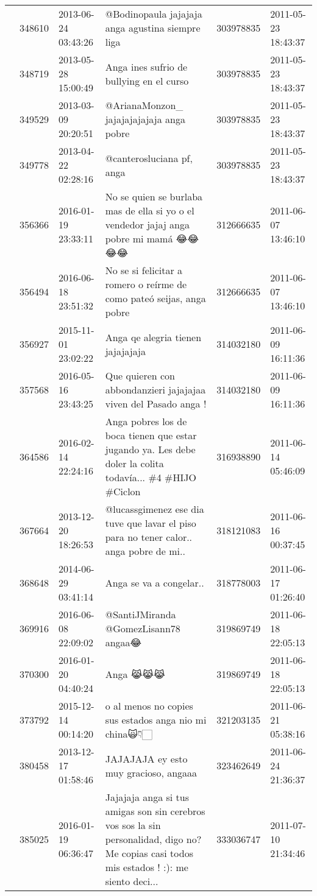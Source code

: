\begin{tabular}{llllrl}
 & 348610& 2013-06-24 03:43:26 & @Bodinopaula jajajaja anga agustina siempre liga & 303978835 & 2011-05-23 18:43:37 \\
 & 348719& 2013-05-28 15:00:49 & Anga ines sufrio de bullying en el curso & 303978835 & 2011-05-23 18:43:37 \\
 & 349529& 2013-03-09 20:20:51 & @ArianaMonzon\_ jajajajajajaja anga pobre & 303978835 & 2011-05-23 18:43:37 \\
 & 349778& 2013-04-22 02:28:16 &@canterosluciana pf, anga & 303978835 & 2011-05-23 18:43:37 \\
 & 356366& 2016-01-19 23:33:11 & No se quien se burlaba mas de ella si yo o el vendedor jajaj anga pobre mi mamá 😂😂😂😂 & 312666635 & 2011-06-07 13:46:10 \\
 & 356494& 2016-06-18 23:51:32 &No se si felicitar a romero o reírme de como pateó seijas, anga pobre & 312666635 & 2011-06-07 13:46:10 \\
 & 356927& 2015-11-01 23:02:22 &Anga qe alegria tienen jajajajaja & 314032180 & 2011-06-09 16:11:36 \\
 & 357568& 2016-05-16 23:43:25 &Que quieren con abbondanzieri jajajajaa viven del Pasado anga ! & 314032180 & 2011-06-09 16:11:36 \\
 & 364586& 2016-02-14 22:24:16 &Anga pobres los de boca tienen que estar jugando ya. Les debe doler la colita todavía... \#4 \#HIJO \#Ciclon & 316938890 & 2011-06-14 05:46:09 \\
 & 367664& 2013-12-20 18:26:53 & @lucassgimenez ese dia tuve que lavar el piso para no tener calor.. anga pobre de mi.. & 318121083 & 2011-06-16 00:37:45 \\
 & 368648& 2014-06-29 03:41:14 &Anga se va a congelar.. & 318778003 & 2011-06-17 01:26:40 \\
 & 369916& 2016-06-08 22:09:02 & @SantiJMiranda @GomezLisann78 angaa😂 & 319869749 & 2011-06-18 22:05:13 \\
 & 370300& 2016-01-20 04:40:24 & Anga 😹😹😹 & 319869749 & 2011-06-18 22:05:13 \\
 & 373792& 2015-12-14 00:14:20 &o al menos no copies sus estados anga nio mi china🙀👇🏻 & 321203135 & 2011-06-21 05:38:16 \\
 & 380458& 2013-12-17 01:58:46 &JAJAJAJA ey esto muy gracioso, angaaa & 323462649 & 2011-06-24 21:36:37 \\
 & 385025& 2016-01-19 06:36:47 &Jajajaja anga si tus amigas son sin cerebros vos sos la sin personalidad, digo no? Me copias casi todos mis estados ! :): me siento deci... & 333036747 & 2011-07-10 21:34:46 \\

\end{tabular}

